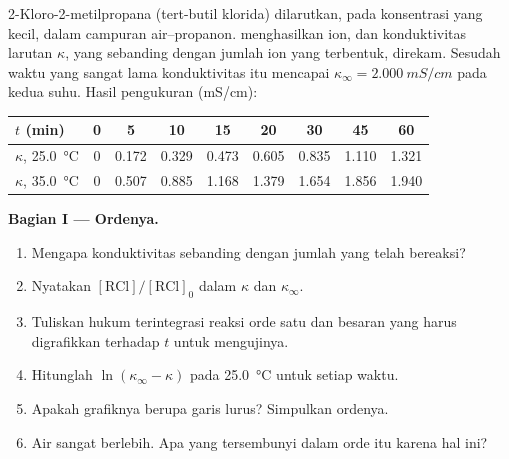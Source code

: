 \begin{problem}
\label{pb:b1:nucleophilic-substitution:1}
2-Kloro-2-metilpropana (tert-butil klorida) dilarutkan, pada konsentrasi
yang kecil, dalam campuran air--propanon. 
 menghasilkan ion, dan
konduktivitas larutan $\kappa$, yang sebanding dengan jumlah ion yang
terbentuk, direkam. Sesudah waktu yang sangat lama konduktivitas itu
mencapai $\kappa_\infty = \qty{2.000}{mS/cm}$ pada kedua suhu.
Hasil pengukuran (\unit{mS/cm}):

\begin{center}
\begin{tabular}{lcccccccc}
\hline
$t$ (min) & 0 & 5 & 10 & 15 & 20 & 30 & 45 & 60 \\
\hline
$\kappa$, \qty{25.0}{\celsius} & 0 & 0.172 & 0.329 & 0.473 & 0.605 & 0.835 & 1.110 & 1.321 \\
$\kappa$, \qty{35.0}{\celsius} & 0 & 0.507 & 0.885 & 1.168 & 1.379 & 1.654 & 1.856 & 1.940 \\
\hline
\end{tabular}
\end{center}

\medskip
\noindent\textbf{Bagian I --- Ordenya.}
\begin{enumerate}
  \item Mengapa konduktivitas sebanding dengan jumlah  yang telah
        bereaksi?
  \item Nyatakan $[\mathrm{RCl}]/[\mathrm{RCl}]_0$ dalam $\kappa$ dan
        $\kappa_\infty$.
  \item Tuliskan hukum terintegrasi reaksi orde satu dan besaran yang
        harus digrafikkan terhadap $t$ untuk mengujinya.
  \item Hitunglah $\ln(\kappa_\infty - \kappa)$ pada \qty{25.0}{\celsius}
        untuk setiap waktu.
  \item Apakah grafiknya berupa garis lurus? Simpulkan ordenya.
  \item Air sangat berlebih. Apa yang tersembunyi dalam orde itu karena
        hal ini?
\end{enumerate}


\end{problem}
